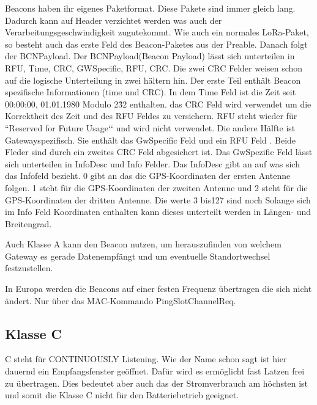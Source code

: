 \documentclass[a4paper,12pt]{article}
\begin{document}
                Beacons haben ihr eigenes Paketformat. Diese Pakete sind immer gleich lang. Dadurch kann auf Header 
                verzichtet werden was auch der Verarbeitungsgeschwindigkeit zugutekommt. Wie auch ein normales 
                LoRa-Paket, so besteht auch das erste Feld des Beacon-Paketes aus der Preable. Danach folgt der 
                BCNPayload. Der BCNPayload(Beacon Payload) lässt sich unterteilen in RFU, Time, CRC, GWSpecific, 
                RFU, CRC. Die zwei CRC Felder weisen schon auf die logische Unterteilung in zwei hältern hin. Der 
                erste Teil enthält Beacon spezifische Informationen (time und CRC). In dem Time Feld ist die Zeit 
                seit 00:00:00, 01.01.1980 Modulo 2\^32 enthalten. das CRC Feld wird verwendet um die Korrektheit des 
                Zeit und des RFU Feldes zu versichern. RFU steht wieder für ``Reserved for Future Usage‘‘ und wird 
                nicht verwendet. Die andere Hälfte ist Gatewayspezifisch. Sie enthält das GwSpecific Feld und ein 
                RFU Feld . Beide Fleder sind  durch ein zweites CRC Feld abgesichert ist. Das GwSpezific Feld lässt 
                sich unterteilen in InfoDesc und Info Felder. Das InfoDesc gibt an auf was sich das Infofeld bezieht. 
                0 gibt an das die GPS-Koordinaten der ersten Antenne folgen. 1 steht für die GPS-Koordinaten der 
                zweiten Antenne und 2 steht für die GPS-Koordinaten der dritten Antenne. Die werte 3 bis127 sind noch 
                Solange sich im Info Feld Koordinaten enthalten kann dieses unterteilt werden in Längen- und 
                Breitengrad.
                
                Auch Klasse A kann den Beacon nutzen, um herauszufinden von welchem Gateway es gerade Datenempfängt 
                und um eventuelle Standortwechsel festzustellen.
                
                In Europa werden die Beacons auf einer festen Frequenz übertragen die sich nicht ändert. Nur über das 
                MAC-Kommando PingSlotChannelReq. 
        \subsection{Klasse C}
            C steht für CONTINUOUSLY Listening. Wie der Name schon sagt ist hier dauernd ein Empfangsfenster geöffnet.
            Dafür wird es ermöglicht fast Latzen frei zu übertragen. Dies bedeutet aber auch das der Stromverbrauch am 
            höchsten ist und somit die Klasse C nicht für den Batteriebetrieb geeignet. 
\end{document}
